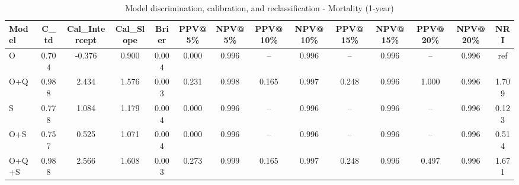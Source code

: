 \begin{table}[htbp]
\centering
\small
\caption{Model discrimination, calibration, and reclassification - Mortality (1-year)}
\label{tab:perf_mortality_1y}
\begin{tabular}{lccccccccccccc}
\toprule
Model & C\_td & Cal\_Intercept & Cal\_Slope & Brier & PPV@5\% & NPV@5\% & PPV@10\% & NPV@10\% & PPV@15\% & NPV@15\% & PPV@20\% & NPV@20\% & NRI \\
\midrule
O & 0.704 & -0.376 & 0.900 & 0.004 & 0.000 & 0.996 & -- & 0.996 & -- & 0.996 & -- & 0.996 & ref \\
O+Q & 0.988 & 2.434 & 1.576 & 0.003 & 0.231 & 0.998 & 0.165 & 0.997 & 0.248 & 0.996 & 1.000 & 0.996 & 1.709 \\
S & 0.778 & 1.084 & 1.179 & 0.004 & 0.000 & 0.996 & -- & 0.996 & -- & 0.996 & -- & 0.996 & 0.123 \\
O+S & 0.757 & 0.525 & 1.071 & 0.004 & 0.000 & 0.996 & -- & 0.996 & -- & 0.996 & -- & 0.996 & 0.514 \\
O+Q+S & 0.988 & 2.566 & 1.608 & 0.003 & 0.273 & 0.999 & 0.165 & 0.997 & 0.248 & 0.996 & 0.497 & 0.996 & 1.671 \\
\bottomrule
\end{tabular}
\end{table}